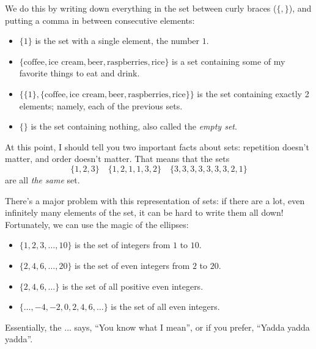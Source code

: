 \documentclass{tufte-book}
\begin{document}
We do this by writing down everything in the set between curly braces ($\{, \}$), and putting a comma in between consecutive elements:
\begin{itemize}
    \item $\{1\}$ is the set with a single element, the number $1$.
    \item $\{\text{coffee}, \text{ice cream}, \text{beer}, \text{raspberries}, \text{rice}\}$ is a set containing some of my favorite things to eat and drink.
    \item $\{\{1\}, \{\text{coffee}, \text{ice cream}, \text{beer}, \text{raspberries}, \text{rice}\}\}$ is the set containing exactly 2 elements; namely, each of the previous sets.
    \item $\{\}$ is the set containing nothing, also called the \emph{empty set}.
\end{itemize}
At this point, I should tell you two important facts about sets: repetition doesn't matter, and order doesn't matter. That means that the sets
\[
\{1, 2, 3\} \quad \{1, 2, 1, 1, 3, 2\} \quad \{3, 3, 3, 3, 3, 3, 3, 2, 1\}
\]
are all \emph{the same} set. 

There's a major problem with this representation of sets: if there are a lot, even infinitely many elements of the set, it can be hard to write them all down! Fortunately, we can use the magic of the ellipses:
\begin{itemize}
    \item $\{1, 2, 3, \dots, 10\}$ is the set of integers from $1$ to $10$.
    \item $\{2, 4, 6, \dots, 20\}$ is the set of even integers from $2$ to $20$.
    \item $\{2, 4, 6, \dots\}$ is the set of all positive even integers.
    \item $\{\dots, -4, -2, 0, 2, 4, 6, \dots\}$ is the set of all even integers.
\end{itemize}
Essentially, the $\dots$ says, ``You know what I mean'', or if you prefer, ``Yadda yadda yadda''.
\end{document}
